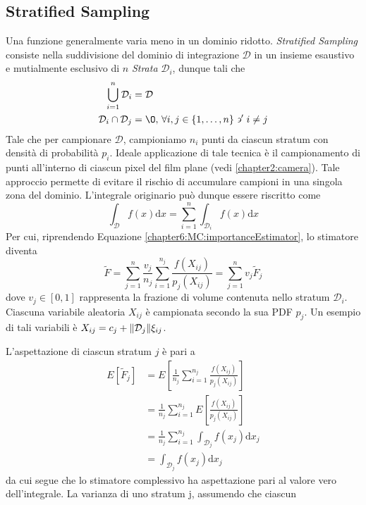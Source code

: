 \subsection{Stratified Sampling}
Una funzione generalmente varia meno in un dominio ridotto. \textit{Stratified Sampling} consiste nella suddivisione del dominio di integrazione 
$\mathcal{D}$ in un insieme esaustivo e mutialmente esclusivo di $n$ \textit{Strata} $\mathcal{D}_i$, dunque tali che
\begin{align*}
	\bigcup_{i=1}^n\mathcal{D}_i &= \mathcal{D} \\
	\mathcal{D}_i\cap\mathcal{D}_j &= \O,\,\forall i,j\in\{1,\ldots,n\}\backepsilon^\prime i\neq j
\end{align*}
Tale che per campionare $\mathcal{D}$, campioniamo $n_i$ punti da ciascun stratum con densit\`a di probabilit\`a $p_i$. Ideale applicazione di tale 
tecnica \`e il campionamento di punti all'interno di ciascun pixel del film plane (vedi \ref{chapter2:camera}). Tale approccio permette di evitare 
il rischio di accumulare campioni in una singola zona del dominio. L'integrale originario pu\`o dunque essere riscritto come
\begin{equation}
	\int_{\mathcal{D}}f(x)\mathrm{d}x=\sum_{i=1}^n\int_{\mathcal{D}_i}f(x)\mathrm{d}x
\end{equation}
Per cui, riprendendo Equazione \ref{chapter6:MC:importanceEstimator}, lo stimatore diventa
\begin{equation}
	\tilde{F}=\sum_{j=1}^n\frac{v_j}{n_j}\sum_{i=1}^{n_j}\frac{f(X_{ij})}{p_j(X_{ij})}=\sum_{j=1}^nv_j\tilde{F}_j
\end{equation}
dove $v_j\in[0,1]$ rappresenta la frazione di volume contenuta nello stratum $\mathcal{D}_i$. Ciascuna variabile aleatoria $X_{ij}$ \`e campionata 
secondo la sua PDF $p_j$. Un esempio di tali variabili \`e $X_{ij}=c_j+\norm{\mathcal{D}_j}\xi_{ij}$.\par
L'aspettazione di ciascun stratum $j$ \`e pari a
\begin{align}
	E\left[\tilde{F}_j\right]&=E\left[\frac{1}{n_j}\sum_{i=1}^{n_j}\frac{f(X_{ij})}{p_j(X_{ij})}\right] \nonumber \\
		&=\frac{1}{n_j}\sum_{i=1}^{n_j}E\left[\frac{f(X_{ij})}{p_j(X_{ij})}\right] \nonumber \\
		&=\frac{1}{n_j}\sum_{i=1}^{n_j}\int_{\mathcal{D}_j}f(x_j)\mathrm{d}x_j \nonumber \\
		&=\int_{\mathcal{D}_j}f(x_j)\mathrm{d}x_j
\end{align}
da cui segue che lo stimatore complessivo ha aspettazione pari al valore vero dell'integrale. La varianza di uno stratum j, assumendo che ciascun 
